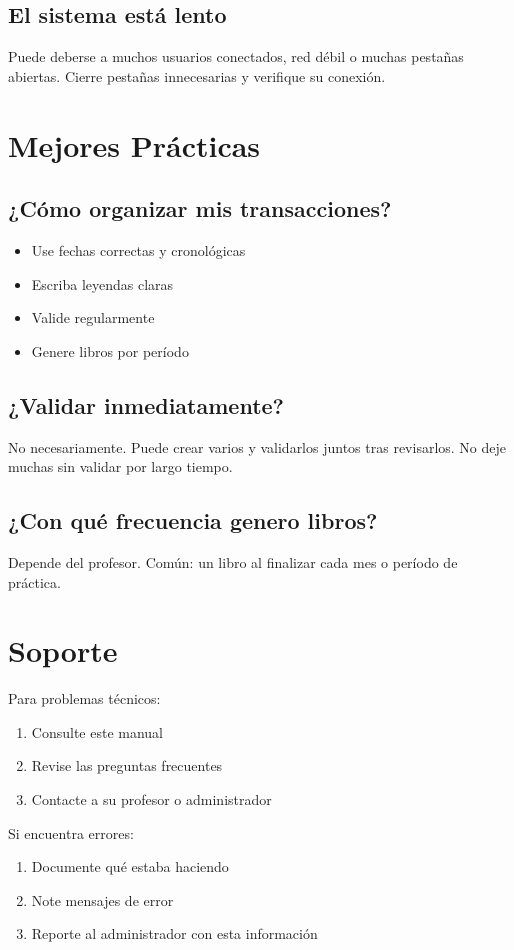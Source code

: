 \subsection{El sistema está lento}

Puede deberse a muchos usuarios conectados, red débil o muchas pestañas abiertas. Cierre pestañas innecesarias y verifique su conexión.

\section{Mejores Prácticas}

\subsection{¿Cómo organizar mis transacciones?}

\begin{itemize}
    \item Use fechas correctas y cronológicas
    \item Escriba leyendas claras
    \item Valide regularmente
    \item Genere libros por período
\end{itemize}

\subsection{¿Validar inmediatamente?}

No necesariamente. Puede crear varios y validarlos juntos tras revisarlos. No deje muchas sin validar por largo tiempo.

\subsection{¿Con qué frecuencia genero libros?}

Depende del profesor. Común: un libro al finalizar cada mes o período de práctica.

\section{Soporte}

Para problemas técnicos:
\begin{enumerate}
    \item Consulte este manual
    \item Revise las preguntas frecuentes
    \item Contacte a su profesor o administrador
\end{enumerate}

Si encuentra errores:
\begin{enumerate}
    \item Documente qué estaba haciendo
    \item Note mensajes de error
    \item Reporte al administrador con esta información
\end{enumerate}